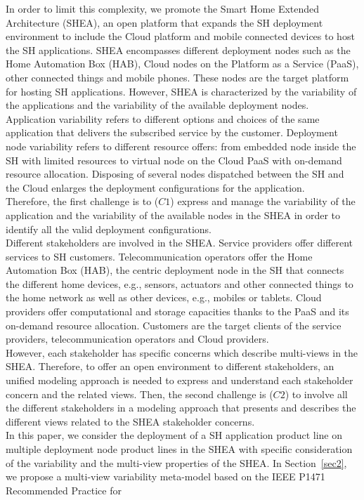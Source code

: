 \documentclass{llncs}
\begin{document}
In order to limit this complexity, we promote the Smart Home Extended Architecture (SHEA), an open platform that expands the SH deployment environment to include the Cloud platform and mobile connected devices to host the SH applications.
SHEA encompasses different deployment nodes such as the Home Automation Box (HAB), Cloud nodes on the Platform as a Service (PaaS), other connected things and mobile phones. These nodes are the target platform for hosting SH applications. However, SHEA is characterized by the variability of the applications and the variability of the available deployment nodes. Application variability refers to different options and choices of the same application that delivers the subscribed service by the customer. Deployment node variability refers to different resource offers: from embedded node inside the SH with limited resources to virtual node on the Cloud PaaS with on-demand resource allocation.
Disposing of several nodes dispatched between the SH and the Cloud enlarges the deployment configurations for the application.  \\
Therefore, the first challenge is to ($C1$) express and manage the variability of the application and the variability of the available nodes in the SHEA in order to identify all the valid deployment configurations.\\
Different stakeholders are involved in the SHEA. Service providers offer different services to SH customers. Telecommunication operators offer the Home Automation Box (HAB), the centric deployment node in the SH that connects the different home devices, e.g., sensors, actuators and other connected things to the home network as well as other devices, e.g., mobiles or tablets. Cloud providers offer computational and storage capacities thanks to the PaaS and its on-demand resource allocation. Customers are the target clients of the service providers, telecommunication operators and Cloud providers.\\
However, each stakeholder has specific concerns which describe multi-views in the SHEA. Therefore, to offer an open environment to different stakeholders,
an unified modeling approach is needed to express and understand each stakeholder concern and the related views.
Then, the second challenge is ($C2$) to involve all the different stakeholders in a modeling approach that presents and describes the different views related to the SHEA stakeholder concerns.\\ 
In this paper, we consider the deployment of a SH application product line on multiple deployment node product lines in the SHEA with specific consideration of the variability and the multi-view properties of the SHEA. In Section~\ref{sec2}, we propose a multi-view variability meta-model based on the IEEE P1471~\cite{jacobson1999unified} Recommended Practice for
\end{document}
